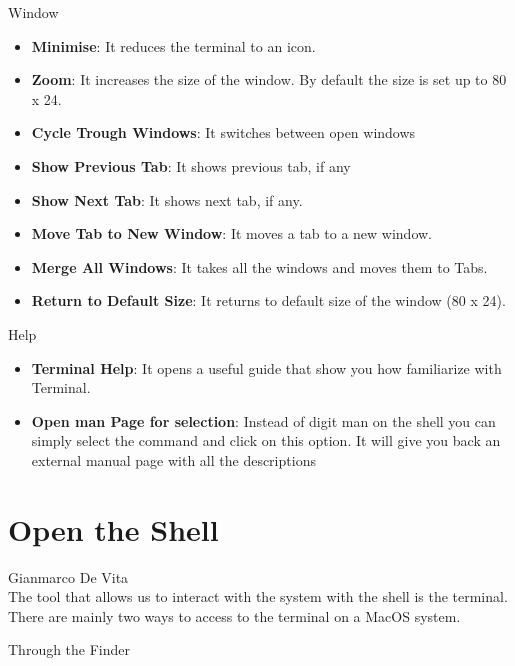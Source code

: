 \documentclass[hidelinks,12pt,a4paper,numbers=enddot]{scrartcl}
\begin{document}
Window



\begin{itemize}
    \item \textbf{Minimise}: It reduces the terminal to an icon.
    \item \textbf{Zoom}:
        It increases the size of the window.
        By default the size is set up to 80 x 24.
    
    \item \textbf{Cycle Trough Windows}: It switches between open windows
    \item \textbf{Show Previous Tab}: It shows previous tab, if any
    \item \textbf{Show Next Tab}: It shows next tab, if any.
    \item \textbf{Move Tab to New Window}: It moves a tab to a new window.
    \item \textbf{Merge All Windows}: It takes all the windows and moves them to Tabs.
    \item \textbf{Return to Default Size}: It returns to default size of the window (80 x 24).
\end{itemize}

Help



\begin{itemize}
    \item \textbf{Terminal Help}:
        It opens a useful guide that show you how familiarize with Terminal.
    
    \item \textbf{Open man Page for selection}:
        Instead of digit man on the shell you can simply select the command and click on this option.
        It will give you back an external manual page with all the descriptions
    
\end{itemize}

\section{Open the Shell}


\large Gianmarco De Vita \normalsize\\



The tool that allows us to interact with the system with the shell is the terminal.
There are mainly two ways to access to the terminal on a MacOS system.

Through the Finder
\end{document}
